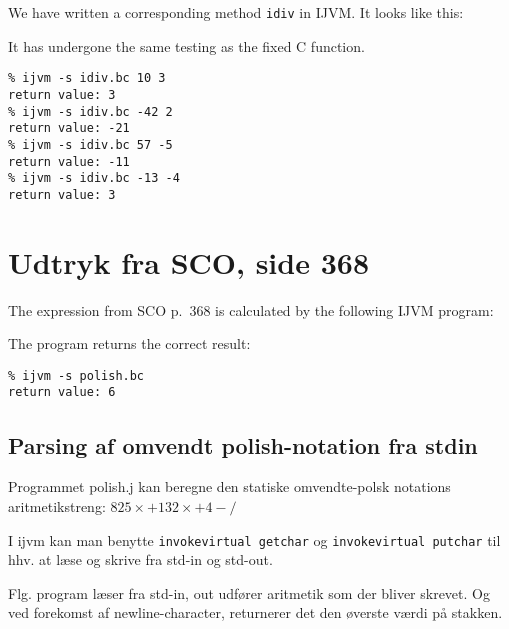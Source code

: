 \documentclass[12pt,a4paper]{article}
\begin{document}
We have written a corresponding method \texttt{idiv} in IJVM. It looks like
this:

\lstset{language=JVMIS}


It has undergone the same testing as the fixed C function.

\lstset{language=sh,numbers=none}
\begin{lstlisting}
% ijvm -s idiv.bc 10 3
return value: 3
% ijvm -s idiv.bc -42 2
return value: -21
% ijvm -s idiv.bc 57 -5
return value: -11
% ijvm -s idiv.bc -13 -4
return value: 3
\end{lstlisting}

\section{Udtryk fra SCO, side 368}
The expression from SCO p.\ 368 is calculated by the following IJVM program:

\lstset{language=JVMIS,numbers=left}


The program returns the correct result:
\lstset{language=sh,numbers=none}
\begin{lstlisting}
% ijvm -s polish.bc
return value: 6
\end{lstlisting}

\subsection{Parsing af omvendt polish-notation fra stdin}
Programmet polish.j kan beregne den statiske omvendte-polsk notations aritmetikstreng:
$825\times+132\times+4-/$

I ijvm kan man benytte \texttt{invokevirtual getchar} og \texttt{invokevirtual putchar} til hhv. at læse og skrive fra std-in og std-out.

Flg. program læser fra std-in, out udfører aritmetik som der bliver skrevet. Og ved forekomst af newline-character, returnerer det den øverste værdi på stakken.
\end{document}
